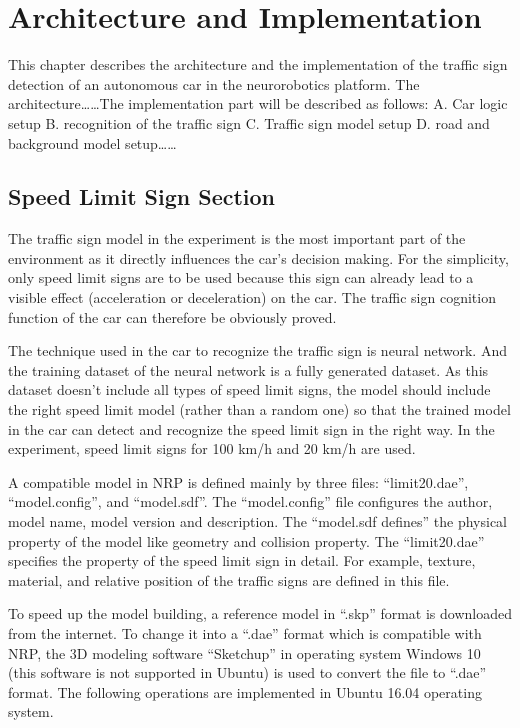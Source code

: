 
\section{Architecture and Implementation}

This chapter describes the architecture and the implementation of the traffic sign detection of an autonomous car in the neurorobotics platform. The architecture……The implementation part will be described as follows: A. Car logic setup B. recognition of the traffic sign C. Traffic sign model setup D. road and background model setup……

\subsection{Speed Limit Sign Section}

The traffic sign model in the experiment is the most important part of the environment as it directly influences the car’s decision making. For the simplicity, only speed limit signs are to be used because this sign can already lead to a visible effect (acceleration or deceleration) on the car. The traffic sign cognition function of the car can therefore be obviously proved. 



The technique used in the car to recognize the traffic sign is neural network. And the training dataset of the neural network is a fully generated dataset. As this dataset doesn’t include all types of speed limit signs, the model should include the right speed limit model (rather than a random one) so that the trained model in the car can detect and recognize the speed limit sign in the right way. In the experiment, speed limit signs for 100 km/h and 20 km/h are used.



A compatible model in NRP is defined mainly by three files: ``limit20.dae'', ``model.config'', and ``model.sdf''. The ``model.config'' file configures the author, model name, model version and description. The ``model.sdf defines'' the physical property of the model like geometry and collision property. The ``limit20.dae'' specifies the property of the speed limit sign in detail. For example, texture, material, and relative position of the traffic signs are defined in this file.



To speed up the model building, a reference model in ``.skp'' format is downloaded from the internet. To change it into a ``.dae'' format which is compatible with NRP, the 3D modeling software ``Sketchup'' in operating system Windows 10 (this software is not supported in Ubuntu) is used to convert the file to ``.dae'' format. The following operations are implemented in Ubuntu 16.04 operating system. 



